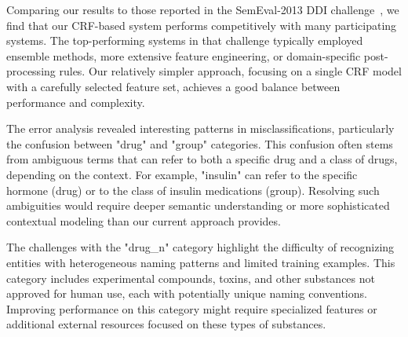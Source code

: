 Comparing our results to those reported in the SemEval-2013 DDI challenge~\cite{semeval2013}, we find that our CRF-based system performs competitively with many participating systems. The top-performing systems in that challenge typically employed ensemble methods, more extensive feature engineering, or domain-specific post-processing rules. Our relatively simpler approach, focusing on a single CRF model with a carefully selected feature set, achieves a good balance between performance and complexity.

The error analysis revealed interesting patterns in misclassifications, particularly the confusion between "drug" and "group" categories. This confusion often stems from ambiguous terms that can refer to both a specific drug and a class of drugs, depending on the context. For example, "insulin" can refer to the specific hormone (drug) or to the class of insulin medications (group). Resolving such ambiguities would require deeper semantic understanding or more sophisticated contextual modeling than our current approach provides.

The challenges with the "drug\_n" category highlight the difficulty of recognizing entities with heterogeneous naming patterns and limited training examples. This category includes experimental compounds, toxins, and other substances not approved for human use, each with potentially unique naming conventions. Improving performance on this category might require specialized features or additional external resources focused on these types of substances.
